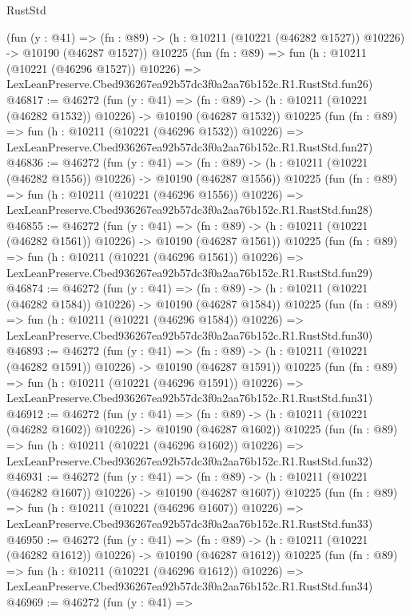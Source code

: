 \begin{lexlean}{RustStd}
\begin{coremodule}
    (fun (y : @41) =>
    (fn : @89) -> (h : @10211 (@10221 (@46282 @1527)) @10226) -> @10190 (@46287 @1527))
    @10225
    (fun (fn : @89) =>
    fun (h : @10211 (@10221 (@46296 @1527)) @10226) =>
    LexLeanPreserve.Cbed936267ea92b57dc3f0a2aa76b152c.R1.RustStd.fun26)
@46817 := @46272
    (fun (y : @41) =>
    (fn : @89) -> (h : @10211 (@10221 (@46282 @1532)) @10226) -> @10190 (@46287 @1532))
    @10225
    (fun (fn : @89) =>
    fun (h : @10211 (@10221 (@46296 @1532)) @10226) =>
    LexLeanPreserve.Cbed936267ea92b57dc3f0a2aa76b152c.R1.RustStd.fun27)
@46836 := @46272
    (fun (y : @41) =>
    (fn : @89) -> (h : @10211 (@10221 (@46282 @1556)) @10226) -> @10190 (@46287 @1556))
    @10225
    (fun (fn : @89) =>
    fun (h : @10211 (@10221 (@46296 @1556)) @10226) =>
    LexLeanPreserve.Cbed936267ea92b57dc3f0a2aa76b152c.R1.RustStd.fun28)
@46855 := @46272
    (fun (y : @41) =>
    (fn : @89) -> (h : @10211 (@10221 (@46282 @1561)) @10226) -> @10190 (@46287 @1561))
    @10225
    (fun (fn : @89) =>
    fun (h : @10211 (@10221 (@46296 @1561)) @10226) =>
    LexLeanPreserve.Cbed936267ea92b57dc3f0a2aa76b152c.R1.RustStd.fun29)
@46874 := @46272
    (fun (y : @41) =>
    (fn : @89) -> (h : @10211 (@10221 (@46282 @1584)) @10226) -> @10190 (@46287 @1584))
    @10225
    (fun (fn : @89) =>
    fun (h : @10211 (@10221 (@46296 @1584)) @10226) =>
    LexLeanPreserve.Cbed936267ea92b57dc3f0a2aa76b152c.R1.RustStd.fun30)
@46893 := @46272
    (fun (y : @41) =>
    (fn : @89) -> (h : @10211 (@10221 (@46282 @1591)) @10226) -> @10190 (@46287 @1591))
    @10225
    (fun (fn : @89) =>
    fun (h : @10211 (@10221 (@46296 @1591)) @10226) =>
    LexLeanPreserve.Cbed936267ea92b57dc3f0a2aa76b152c.R1.RustStd.fun31)
@46912 := @46272
    (fun (y : @41) =>
    (fn : @89) -> (h : @10211 (@10221 (@46282 @1602)) @10226) -> @10190 (@46287 @1602))
    @10225
    (fun (fn : @89) =>
    fun (h : @10211 (@10221 (@46296 @1602)) @10226) =>
    LexLeanPreserve.Cbed936267ea92b57dc3f0a2aa76b152c.R1.RustStd.fun32)
@46931 := @46272
    (fun (y : @41) =>
    (fn : @89) -> (h : @10211 (@10221 (@46282 @1607)) @10226) -> @10190 (@46287 @1607))
    @10225
    (fun (fn : @89) =>
    fun (h : @10211 (@10221 (@46296 @1607)) @10226) =>
    LexLeanPreserve.Cbed936267ea92b57dc3f0a2aa76b152c.R1.RustStd.fun33)
@46950 := @46272
    (fun (y : @41) =>
    (fn : @89) -> (h : @10211 (@10221 (@46282 @1612)) @10226) -> @10190 (@46287 @1612))
    @10225
    (fun (fn : @89) =>
    fun (h : @10211 (@10221 (@46296 @1612)) @10226) =>
    LexLeanPreserve.Cbed936267ea92b57dc3f0a2aa76b152c.R1.RustStd.fun34)
@46969 := @46272
    (fun (y : @41) =>

\end{coremodule}
\end{lexlean}
